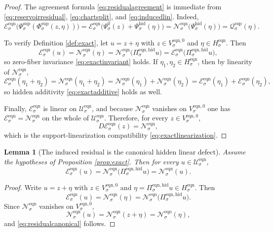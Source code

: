 \documentclass[11pt]{article}
\newcommand{\EqnSpace}[1]{\mathcal U_{#1}^{\mathrm{eqn}}}
\newcommand{\EqnResidual}[1]{\mathcal E_{#1}^{\mathrm{eqn}}}
\newcommand{\EqnZero}[1]{V_{#1}^{\mathrm{eqn},0}}
\newcommand{\EqnHidden}[1]{H_{#1}^{\mathrm{eqn}}}
\newcommand{\EqnProj}[1]{\Pi_{#1}^{\mathrm{eqn,hid}}}
\newcommand{\EqnLin}[1]{\mathcal N_{#1}^{\mathrm{eqn}}}
\newcommand{\ShellChart}[1]{\Psi_{#1}^{\mathrm{sup}}}
\newcommand{\ZeroChart}[1]{\Psi_{#1}^{0}}
\newcommand{\HiddenChart}[1]{\Psi_{#1}^{\mathrm{hid}}}
\newcommand{\SplitMap}[1]{\Phi_{#1}^{\mathrm{sup}}}
\newcommand{\HiddenCharge}[1]{\mathcal Q_{#1}^{\mathrm{sup}}}
\newtheorem{lemma}{Lemma}
\begin{document}
\begin{proof}
The agreement formula \eqref{eq:residualagreement} is immediate from \eqref{eq:reservoirresidual}, \eqref{eq:chartsplit}, and \eqref{eq:inducedlin}. Indeed,
\[
\EqnResidual{\sigma}\bigl(\ShellChart{\sigma}(\SplitMap{\sigma}(z,\eta))\bigr)
=
\EqnResidual{\sigma}\bigl(\ZeroChart{\sigma}(z)+\HiddenChart{\sigma}(\eta)\bigr)
=
\EqnLin{\sigma}\bigl(\HiddenChart{\sigma}(\eta)\bigr)
=
\HiddenCharge{\sigma}(\eta).
\]

To verify Definition \ref{def:exact}, let \(u=z+\eta\) with \(z\in\EqnZero{\sigma}\) and \(\eta\in\EqnHidden{\sigma}\). Then
\[
\EqnResidual{\sigma}(u)
=
\EqnLin{\sigma}(\eta)
=
\EqnLin{\sigma}\bigl(\EqnProj{\sigma}u\bigr)
=
\EqnResidual{\sigma}\bigl(\EqnProj{\sigma}u\bigr),
\]
so zero-fiber invariance \eqref{eq:exactinvariant} holds. If \(\eta_{1},\eta_{2}\in\EqnHidden{\sigma}\), then by linearity of \(\EqnLin{\sigma}\),
\[
\EqnResidual{\sigma}(\eta_{1}+\eta_{2})
=
\EqnLin{\sigma}(\eta_{1}+\eta_{2})
=
\EqnLin{\sigma}(\eta_{1})+\EqnLin{\sigma}(\eta_{2})
=
\EqnResidual{\sigma}(\eta_{1})+\EqnResidual{\sigma}(\eta_{2}),
\]
so hidden additivity \eqref{eq:exactadditive} holds as well.

Finally, \(\EqnResidual{\sigma}\) is linear on \(\EqnSpace{\sigma}\), and because \(\EqnLin{\sigma}\) vanishes on \(\EqnZero{\sigma}\) one has \(\EqnResidual{\sigma}=\EqnLin{\sigma}\) on the whole of \(\EqnSpace{\sigma}\). Therefore, for every \(z\in\EqnZero{\sigma}\),
\[
D\EqnResidual{\sigma}(z)=\EqnLin{\sigma},
\]
which is the support-linearization compatibility \eqref{eq:exactlinearization}.
\end{proof}

\begin{lemma}[The induced residual is the canonical hidden linear defect]
\label{lem:canonical}
Assume the hypotheses of Proposition \ref{prop:exact}. Then for every \(u\in\EqnSpace{\sigma}\),
\begin{equation}
\EqnResidual{\sigma}(u)
=
\EqnLin{\sigma}\bigl(\EqnProj{\sigma}u\bigr)
=
\EqnLin{\sigma}(u).
\label{eq:residualcanonical}
\end{equation}
\end{lemma}

\begin{proof}
Write \(u=z+\eta\) with \(z\in\EqnZero{\sigma}\) and \(\eta=\EqnProj{\sigma}u\in\EqnHidden{\sigma}\). Then
\[
\EqnResidual{\sigma}(u)
=
\EqnLin{\sigma}(\eta)
=
\EqnLin{\sigma}\bigl(\EqnProj{\sigma}u\bigr).
\]
Since \(\EqnLin{\sigma}\) vanishes on \(\EqnZero{\sigma}\),
\[
\EqnLin{\sigma}(u)=\EqnLin{\sigma}(z+\eta)=\EqnLin{\sigma}(\eta),
\]
and \eqref{eq:residualcanonical} follows.
\end{proof}
\end{document}
